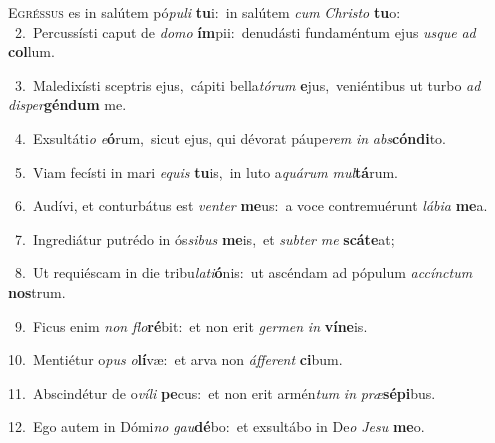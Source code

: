 \lettrine{\initial\textcolor{\initialcolor}{E}}{gréssus} es in salútem pó\-\textit{pu}\-\textit{li} \textbf{tu}\-i:~\star in salútem \textit{cum} \textit{Chris}\-\textit{to} \textbf{tu}\-o:\\
{\numbfont\textcolor{\numbcolor}{~2.}}~Percussísti caput de \textit{do}\-\textit{mo} \textbf{ím}\-pii:~\star denudásti fundaméntum ejus \textit{us}\-\textit{que} \textit{ad} \textbf{col}\-lum.\par
{\numbfont\textcolor{\numbcolor}{~3.}}~Maledixísti sceptris ejus,~\dagger cápiti bella\-\textit{tó}\-\textit{rum} \textbf{e}\-jus,~\star veniéntibus ut turbo \textit{ad} \textit{di}\-\textit{sper}\textbf{gén}\textbf{dum} me.\par
{\numbfont\textcolor{\numbcolor}{~4.}}~Exsultáti\textit{o} \textit{e}\-\textbf{ó}rum,~\star sicut ejus, qui dévorat páupe\textit{rem} \textit{in} \textit{abs}\-\textbf{cón}\textbf{di}to.\par
{\numbfont\textcolor{\numbcolor}{~5.}}~Viam fecísti in mari \textit{e}\-\textit{quis} \textbf{tu}\-is,~\star in luto a\-\textit{quá}\-\textit{rum} \textit{mul}\-\textbf{tá}rum.\par
{\numbfont\textcolor{\numbcolor}{~6.}}~Audívi, et conturbátus est \textit{ven}\-\textit{ter} \textbf{me}\-us:~\star a voce contremuérunt \textit{lá}\-\textit{bi}\textit{a} \textbf{me}\-a.\par
{\numbfont\textcolor{\numbcolor}{~7.}}~Ingrediátur putrédo in ós\-\textit{si}\-\textit{bus} \textbf{me}\-is,~\star et \textit{sub}\-\textit{ter} \textit{me} \textbf{scá}\-\textbf{te}at;\par
{\numbfont\textcolor{\numbcolor}{~8.}}~Ut requiéscam in die tribu\-\textit{la}\-\textit{ti}\textbf{ó}nis:~\star ut ascéndam ad pópulum \textit{ac}\-\textit{cínc}\textit{tum} \textbf{nos}\-trum.\par
{\numbfont\textcolor{\numbcolor}{~9.}}~Ficus enim \textit{non} \textit{flo}\-\textbf{ré}bit:~\star et non erit \textit{ger}\-\textit{men} \textit{in} \textbf{ví}\-\textbf{ne}is.\par
{\numbfont\textcolor{\numbcolor}{10.}}~Mentiétur o\textit{pus} \textit{o}\-\textbf{lí}væ:~\star et arva non \textit{áf}\-\textit{fe}\textit{rent} \textbf{ci}\-bum.\par
{\numbfont\textcolor{\numbcolor}{11.}}~Abscindétur de o\-\textit{ví}\-\textit{li} \textbf{pe}\-cus:~\star et non erit armén\textit{tum} \textit{in} \textit{præ}\-\textbf{sé}\textbf{pi}bus.\par
{\numbfont\textcolor{\numbcolor}{12.}}~Ego autem in Dómi\textit{no} \textit{gau}\-\textbf{dé}bo:~\star et exsultábo in De\textit{o} \textit{Je}\-\textit{su} \textbf{me}\-o.\par
